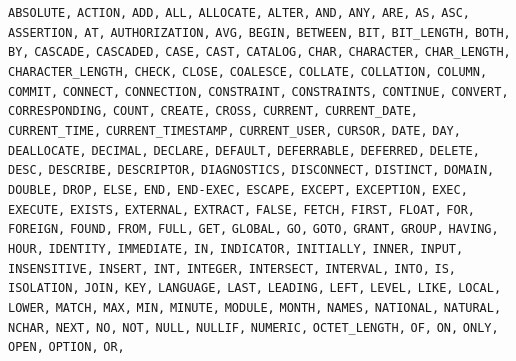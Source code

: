 \documentclass[11pt,a4paper]{ivoa}
\begin{document}
\begin{raggedright}
\noindent
\texttt{ABSOLUTE,} \texttt{ACTION,} \texttt{ADD,} \texttt{ALL,}
\texttt{ALLOCATE,} \texttt{ALTER,} \texttt{AND,} \texttt{ANY,}
\texttt{ARE,} \texttt{AS,} \texttt{ASC,} \texttt{ASSERTION,}
\texttt{AT,} \texttt{AUTHORIZATION,} \texttt{AVG,} \texttt{BEGIN,}
\texttt{BETWEEN,} \texttt{BIT,} \texttt{BIT\_LENGTH,} \texttt{BOTH,}
\texttt{BY,} \texttt{CASCADE,} \texttt{CASCADED,} \texttt{CASE,}
\texttt{CAST,} \texttt{CATALOG,} \texttt{CHAR,} \texttt{CHARACTER,}
\texttt{CHAR\_LENGTH,} \texttt{CHARACTER\_LENGTH,} \texttt{CHECK,}
\texttt{CLOSE,} \texttt{COALESCE,} \texttt{COLLATE,}
\texttt{COLLATION,} \texttt{COLUMN,} \texttt{COMMIT,}
\texttt{CONNECT,} \texttt{CONNECTION,} \texttt{CONSTRAINT,}
\texttt{CONSTRAINTS,} \texttt{CONTINUE,} \texttt{CONVERT,}
\texttt{CORRESPONDING,} \texttt{COUNT,} \texttt{CREATE,}
\texttt{CROSS,} \texttt{CURRENT,} \texttt{CURRENT\_DATE,}
\texttt{CURRENT\_TIME,} \texttt{CURRENT\_TIMESTAMP,}
\texttt{CURRENT\_USER,} \texttt{CURSOR,} \texttt{DATE,} \texttt{DAY,}
\texttt{DEALLOCATE,} \texttt{DECIMAL,} \texttt{DECLARE,}
\texttt{DEFAULT,} \texttt{DEFERRABLE,} \texttt{DEFERRED,}
\texttt{DELETE,} \texttt{DESC,} \texttt{DESCRIBE,}
\texttt{DESCRIPTOR,} \texttt{DIAGNOSTICS,} \texttt{DISCONNECT,}
\texttt{DISTINCT,} \texttt{DOMAIN,} \texttt{DOUBLE,} \texttt{DROP,}
\texttt{ELSE,} \texttt{END,} \texttt{END-EXEC,} \texttt{ESCAPE,}
\texttt{EXCEPT,} \texttt{EXCEPTION,} \texttt{EXEC,} \texttt{EXECUTE,}
\texttt{EXISTS,} \texttt{EXTERNAL,} \texttt{EXTRACT,} \texttt{FALSE,}
\texttt{FETCH,} \texttt{FIRST,} \texttt{FLOAT,} \texttt{FOR,}
\texttt{FOREIGN,} \texttt{FOUND,} \texttt{FROM,} \texttt{FULL,}
\texttt{GET,} \texttt{GLOBAL,} \texttt{GO,} \texttt{GOTO,}
\texttt{GRANT,} \texttt{GROUP,} \texttt{HAVING,} \texttt{HOUR,}
\texttt{IDENTITY,} \texttt{IMMEDIATE,} \texttt{IN,}
\texttt{INDICATOR,} \texttt{INITIALLY,} \texttt{INNER,}
\texttt{INPUT,} \texttt{INSENSITIVE,} \texttt{INSERT,} \texttt{INT,}
\texttt{INTEGER,} \texttt{INTERSECT,} \texttt{INTERVAL,}
\texttt{INTO,} \texttt{IS,} \texttt{ISOLATION,} \texttt{JOIN,}
\texttt{KEY,} \texttt{LANGUAGE,} \texttt{LAST,} \texttt{LEADING,}
\texttt{LEFT,} \texttt{LEVEL,} \texttt{LIKE,} \texttt{LOCAL,} \texttt{LOWER,}
\texttt{MATCH,} \texttt{MAX,} \texttt{MIN,}
\texttt{MINUTE,} \texttt{MODULE,} \texttt{MONTH,} \texttt{NAMES,}
\texttt{NATIONAL,} \texttt{NATURAL,} \texttt{NCHAR,} \texttt{NEXT,}
\texttt{NO,} \texttt{NOT,} \texttt{NULL,} \texttt{NULLIF,}
\texttt{NUMERIC,} \texttt{OCTET\_LENGTH,} \texttt{OF,} \texttt{ON,}
\texttt{ONLY,} \texttt{OPEN,} \texttt{OPTION,} \texttt{OR,}

\end{raggedright}
\end{document}
